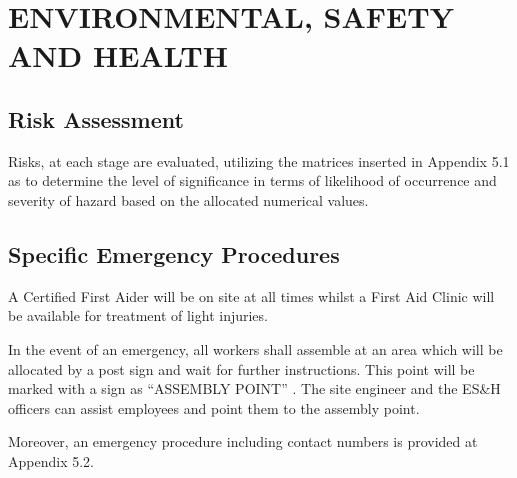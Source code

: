 \section{ENVIRONMENTAL, SAFETY AND HEALTH}

\subsection{Risk Assessment}

Risks, at each stage are evaluated, utilizing the matrices inserted in Appendix 5.1 as to determine the level of significance in terms of likelihood of occurrence and severity of hazard based on the allocated numerical values.

\subsection{Specific Emergency Procedures}

A Certified First Aider will be on site at all times whilst a First Aid Clinic will be available for treatment of light injuries.

In the event of an emergency, all workers shall assemble at an area which will be allocated by a post sign and wait for further instructions. This point will be marked with a sign as ``ASSEMBLY POINT'' . The site engineer and the ES\&H officers can assist employees and point them to the assembly point.

Moreover, an emergency procedure including contact numbers is provided at Appendix 5.2.

